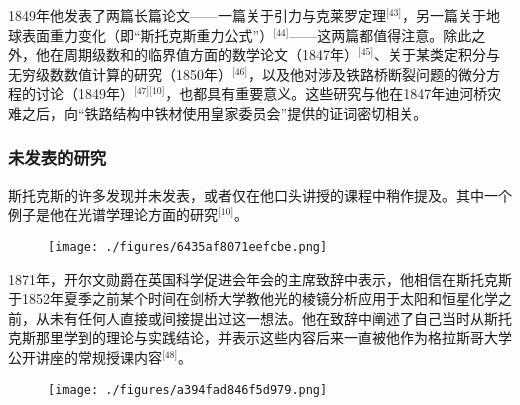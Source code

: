 1849年他发表了两篇长篇论文——一篇关于引力与克莱罗定理\(^\text{[43]}\)，另一篇关于地球表面重力变化（即“斯托克斯重力公式”）\(^\text{[44]}\)——这两篇都值得注意。除此之外，他在周期级数和的临界值方面的数学论文（1847年）\(^\text{[45]}\)、关于某类定积分与无穷级数数值计算的研究（1850年）\(^\text{[46]}\)，以及他对涉及铁路桥断裂问题的微分方程的讨论（1849年）\(^\text{[47][10]}\)，也都具有重要意义。这些研究与他在1847年迪河桥灾难之后，向“铁路结构中铁材使用皇家委员会”提供的证词密切相关。
\subsubsection{未发表的研究}
斯托克斯的许多发现并未发表，或者仅在他口头讲授的课程中稍作提及。其中一个例子是他在光谱学理论方面的研究\(^\text{[10]}\)。
\begin{figure}[ht]
\centering
\texttt{[image: ./figures/6435af8071eefcbe.png]}
\caption{} \label{fig_QZstks_6}
\end{figure}
1871年，开尔文勋爵在英国科学促进会年会的主席致辞中表示，他相信在斯托克斯于1852年夏季之前某个时间在剑桥大学教他光的棱镜分析应用于太阳和恒星化学之前，从未有任何人直接或间接提出过这一想法。他在致辞中阐述了自己当时从斯托克斯那里学到的理论与实践结论，并表示这些内容后来一直被他作为格拉斯哥大学公开讲座的常规授课内容\(^\text{[48]}\)。
\begin{figure}[ht]
\centering
\texttt{[image: ./figures/a394fad846f5d979.png]}
\caption{} \label{fig_QZstks_7}
\end{figure}

